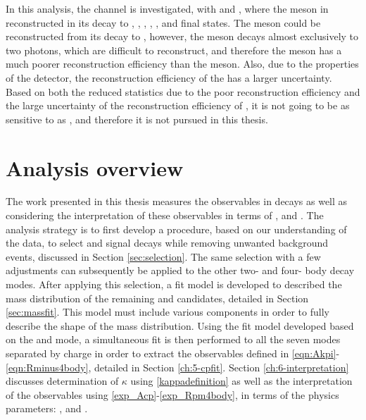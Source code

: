 In this analysis, the \decay{\Bm}{\D\Kstarm} channel is investigated, with \decay{\Kstarm}{\KS\pim} and \decay{\KS}{\pim\pip}, where the \Dz meson in reconstructed in its decay to \Km\pip, \Kp\Km, \pip\pim, \Kp\pim, \Km\pip\pim\pip, \pip\pim\pip\pim and \Kp\pim\pip\pim final states. The \Kstarm meson could be reconstructed from its decay to \Km\piz, however, the \piz meson decays almost exclusively to two photons, which are difficult to reconstruct, and therefore the \piz meson has a much poorer reconstruction efficiency than the \KS meson. Also, due to the properties of the detector, the reconstruction efficiency of the \piz has a larger uncertainty. Based on both the reduced statistics due to the poor reconstruction efficiency and the large uncertainty of the reconstruction efficiency of \Km\piz, it is not going to be as sensitive to \Pgamma as \KS\pim, and therefore it is not pursued in this thesis.

\section{Analysis overview}

The work presented in this thesis measures the \CP observables in \decay{\Bm}{\D\Kstarm} decays as well as considering the interpretation of these observables in terms of \rb, \deltab and \Pgamma. The analysis strategy is to first develop a procedure, based on our understanding of the data, to select \decay{\Bm}{\D(\Km\pip)\Kstarm} and \kpipipi signal decays while removing unwanted background events, discussed in Section \ref{sec:selection}. The same selection with a few adjustments can subsequently be applied to the other two- and four- body \D decay modes. After applying this selection, a fit model is developed to described the \B mass distribution of the remaining \decay{\Bm}{\D(\Km\pip)\Kstarm} and \kpipipi candidates, detailed in Section \ref{sec:massfit}. This model must include various components in order to fully describe the shape of the \B mass distribution. Using the fit model developed based on the \decay{\Bm}{\D(\Km\pip)\Kstarm} and \kpipipi mode, a simultaneous fit is then performed to all the seven \D modes separated by \B charge in order to extract the \CP observables defined in \eqn\ref{eqn:Akpi}-\ref{eqn:Rminus4body}, detailed in Section \ref{ch:5-cpfit}. Section \ref{ch:6-interpretation} discusses determination of $\kappa$ using \eqn\ref{kappadefinition} as well as the interpretation of the \CP observables using \eqn\ref{exp_Acp}-\ref{exp_Rpm4body}, in terms of the physics parameters: \rb, \deltab and \Pgamma.